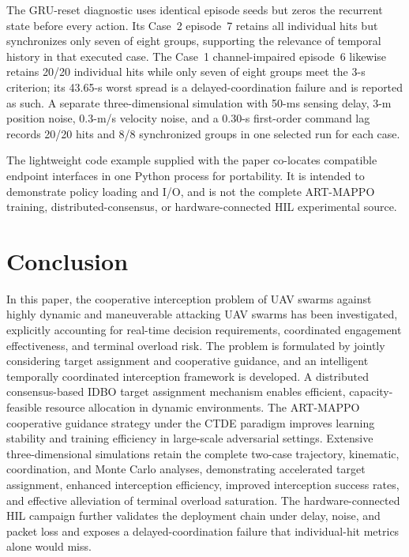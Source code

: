 \documentclass[lettersize,journal]{IEEEtran}
\begin{document}
The GRU-reset diagnostic uses identical episode seeds but zeros the recurrent
state before every action. Its Case~2 episode~7 retains all individual hits but
synchronizes only seven of eight groups, supporting the relevance of temporal
history in that executed case. The Case~1 channel-impaired episode~6 likewise
retains 20/20 individual hits while only seven of eight groups meet the 3-s
criterion; its 43.65-s worst spread is a delayed-coordination failure and is
reported as such. A separate three-dimensional simulation with 50-ms sensing
delay, 3-m position noise, 0.3-m/s velocity noise, and a 0.30-s first-order
command lag records 20/20 hits and 8/8 synchronized groups in one selected run
for each case.

The lightweight code example supplied with the paper co-locates compatible
endpoint interfaces in one Python process for portability. It is intended to
demonstrate policy loading and I/O, and is not the complete ART-MAPPO training,
distributed-consensus, or hardware-connected HIL experimental source.



\clearpage
\section{Conclusion}
\label{sec:conclusion}

In this paper, the cooperative interception problem of UAV swarms against highly dynamic and
maneuverable attacking UAV swarms has been investigated, explicitly accounting for real-time
decision requirements, coordinated engagement effectiveness, and terminal overload risk.
The problem is formulated by jointly considering target assignment and cooperative guidance,
and an intelligent temporally coordinated interception framework is developed.
A distributed consensus-based IDBO target assignment mechanism enables
efficient, capacity-feasible resource allocation in dynamic environments.
The ART-MAPPO cooperative guidance strategy under the CTDE paradigm improves learning
stability and training efficiency in large-scale adversarial settings.
Extensive three-dimensional simulations retain the complete two-case trajectory,
kinematic, coordination, and Monte Carlo analyses, demonstrating accelerated
target assignment, enhanced interception efficiency, improved interception
success rates, and effective alleviation of terminal overload saturation. The
hardware-connected HIL campaign further validates the deployment chain under
delay, noise, and packet loss and exposes a delayed-coordination failure that
individual-hit metrics alone would miss.
\end{document}
